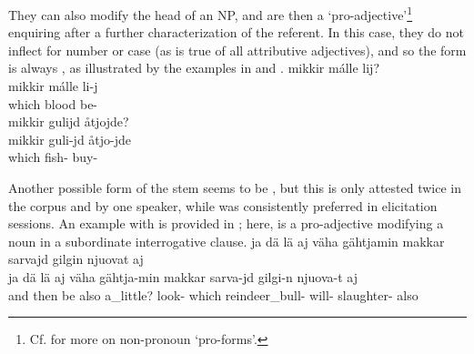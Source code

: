 They can also modify the head of an NP, and are then a ‘pro-adjective’\footnote{Cf. \citet[31-34]{SchachterShopen2007} for more on non-pronoun ‘pro-forms’.} enquiring after a further characterization of the referent. In this case, they do not inflect for number or case (as is true of all attributive adjectives), and so the form is always , as illustrated by the examples in  and . %
\ea\label{QpronounDEMGeneralEx3}
\glll	mikkir málle lij?\\
	mikkir málle li-j\\
	which blood\BS{} be-\\\nopagebreak
{}	
\z
\ea\label{QpronounDEMGeneralEx4}
\glll	mikkir gulijd åtjojde?\\
	mikkir guli-jd åtjo-jde\\
	which fish- buy-\\\nopagebreak
{}	
\z

Another possible form of the stem seems to be , but this is only attested twice in the corpus and by one speaker, while  was consistently preferred in elicitation sessions. %
An example with  is provided in ; here,  is a pro-adjective modifying a noun in a subordinate interrogative clause. 
\ea\label{QpronounDEMGeneralEx5}
\glll	ja dä lä aj väha gähtjamin makkar sarvajd gilgin njuovat aj\\
	ja dä lä aj väha gähtja-min makkar sarva-jd gilgi-n njuova-t aj\\
	and then be\BS{} also a\_little? look- which reindeer\_bull- will- slaughter- also\\\nopagebreak
{}	
\z



